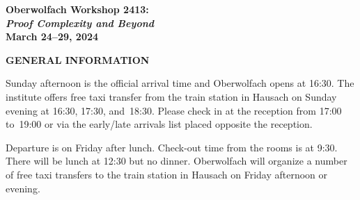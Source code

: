 \documentclass[11pt]{article}
\begin{document}
\begin{center}

  \Large{\bf
    Oberwolfach Workshop 2413: \\
    \textit{Proof Complexity and Beyond}  \\
    March 24--29, 2024}
\end{center}

\medskip

\begin{center}
{\bf GENERAL INFORMATION}
\end{center}

%   
%   
%   
%   
%   


\begin{compactitem}

\item
  Sunday afternoon is the official arrival time and Oberwolfach opens
  at 16:30. The institute offers free taxi transfer from the train
  station in Hausach on Sunday evening
  at 16:30, 17:30, and~18:30.
  Please check in at the reception from 17:00 to~19:00 or via the
  early/late arrivals list placed opposite the reception.

\item
  Departure is on Friday after lunch.
  Check-out time from the rooms is at 9:30. There will be
  lunch at 12:30 but no dinner. Oberwolfach will
  organize a number of free taxi transfers to the train
  station in Hausach on Friday afternoon or evening.
\end{compactitem}
\end{document}
